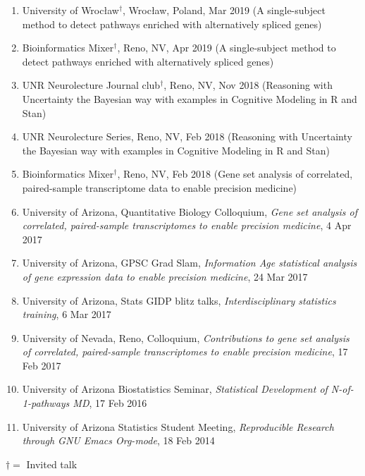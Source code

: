 \documentclass[paper=a4,fontsize=11pt]{scrartcl} %
\newcommand{\TalkEntry}[4]{
		\noindent #1, #2, #3 #4}
\begin{document}
\begin{enumerate}
  \item\TalkEntry{University of Wrocław$^{\dagger}$}{Wrocław, Poland}{Mar 2019}{(A single-subject method to detect pathways enriched with alternatively spliced genes)}

  \item\TalkEntry{Bioinformatics Mixer$^{\dagger}$}{Reno, NV}{Apr 2019}{(A single-subject method to detect pathways enriched with alternatively spliced genes)}
  
  \item\TalkEntry{UNR Neurolecture Journal club$^{\dagger}$}{Reno, NV}{Nov 2018}{(Reasoning with Uncertainty the Bayesian way with examples in Cognitive Modeling in R and Stan)}
  
  \item\TalkEntry{UNR Neurolecture Series}{Reno, NV}{Feb 2018}{(Reasoning with Uncertainty the Bayesian way with examples in Cognitive Modeling in R and Stan)}

\item\TalkEntry{Bioinformatics Mixer$^{\dagger}$}{Reno, NV}{Feb 2018}{(Gene set analysis of correlated, paired-sample transcriptome data to enable precision medicine)}
  
\item\TalkEntry{University of Arizona, Quantitative Biology Colloquium}{\textit{Gene set analysis of correlated, paired-sample transcriptomes to enable precision medicine}}{4 Apr 2017}{}  
  \item\TalkEntry{University of Arizona, GPSC Grad Slam}{\textit{Information Age statistical analysis of gene expression data to enable precision medicine}}{24 Mar 2017}{}
\item\TalkEntry{University of Arizona, Stats GIDP blitz talks}{\textit{Interdisciplinary statistics training}}{6 Mar 2017}{}

\item\TalkEntry{University of Nevada, Reno, Colloquium}{\textit{Contributions to gene set analysis of correlated, paired-sample transcriptomes to enable precision medicine}}{17 Feb 2017}{}

\item\TalkEntry{University of Arizona Biostatistics Seminar}{\textit{Statistical Development of N-of-1-pathways MD}}{17 Feb 2016}{}
\item\TalkEntry{University of Arizona Statistics Student Meeting}{\textit{Reproducible Research through GNU Emacs Org-mode}}{18 Feb 2014}{}
\vspace{-7pt}
\end{enumerate}
$\dagger=$ Invited talk
\end{document}
